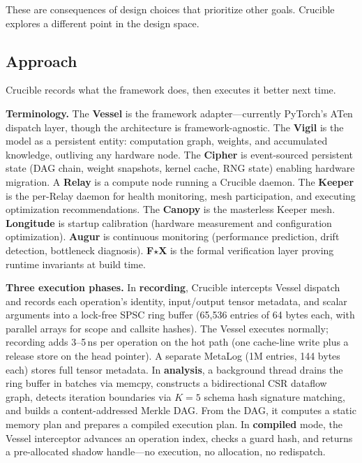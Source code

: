 These are consequences of design choices that prioritize other goals.
Crucible explores a different point in the design space.

\subsection{Approach}

Crucible records what the framework does, then executes it better next time.

\textbf{Terminology.}
The \textbf{Vessel} is the framework adapter---currently PyTorch's ATen dispatch layer, though the architecture is framework-agnostic.
The \textbf{Vigil} is the model as a persistent entity: computation graph, weights, and accumulated knowledge, outliving any hardware node.
The \textbf{Cipher} is event-sourced persistent state (DAG chain, weight snapshots, kernel cache, RNG state) enabling hardware migration.
A \textbf{Relay} is a compute node running a Crucible daemon.
The \textbf{Keeper} is the per-Relay daemon for health monitoring, mesh participation, and executing optimization recommendations.
The \textbf{Canopy} is the masterless Keeper mesh.
\textbf{Longitude} is startup calibration (hardware measurement and configuration optimization).
\textbf{Augur} is continuous monitoring (performance prediction, drift detection, bottleneck diagnosis).
\textbf{F$\star$X} is the formal verification layer proving runtime invariants at build time.

\textbf{Three execution phases.}
In \textbf{recording}, Crucible intercepts Vessel dispatch and records each operation's identity, input/output tensor metadata, and scalar arguments into a lock-free SPSC ring buffer (65,536 entries of 64 bytes each, with parallel arrays for scope and callsite hashes).
The Vessel executes normally; recording adds 3--5\,ns per operation on the hot path (one cache-line write plus a release store on the head pointer).
A separate MetaLog (1M entries, 144 bytes each) stores full tensor metadata.
In \textbf{analysis}, a background thread drains the ring buffer in batches via memcpy, constructs a bidirectional CSR dataflow graph, detects iteration boundaries via $K{=}5$ schema hash signature matching, and builds a content-addressed Merkle DAG.
From the DAG, it computes a static memory plan and prepares a compiled execution plan.
In \textbf{compiled} mode, the Vessel interceptor advances an operation index, checks a guard hash, and returns a pre-allocated shadow handle---no execution, no allocation, no redispatch.

